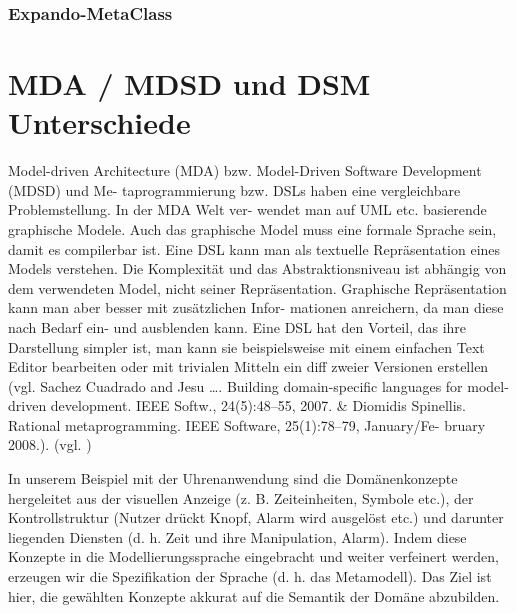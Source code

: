 \documentclass[11pt,english,ngerman, headsepline]{scrreprt}
\begin{document}
\subsection{Expando-MetaClass}


\chapter{MDA / MDSD und DSM Unterschiede} 
Model-driven Architecture (MDA) bzw. Model-Driven Software Development (MDSD)
und Me- taprogrammierung bzw. DSLs haben eine vergleichbare Problemstellung. In
der MDA Welt ver- wendet man auf UML etc. basierende graphische Modele. Auch das
graphische Model muss eine formale Sprache sein, damit es compilerbar ist. Eine
DSL kann man als textuelle Repräsentation eines Models verstehen.
Die Komplexität und das Abstraktionsniveau ist abhängig von dem verwendeten
Model, nicht seiner Repräsentation. Graphische Repräsentation kann man aber
besser mit zusätzlichen Infor- mationen anreichern, da man diese nach Bedarf
ein- und ausblenden kann.
Eine DSL hat den Vorteil, das ihre Darstellung simpler ist, man kann sie
beispielsweise mit einem einfachen Text Editor bearbeiten oder mit trivialen
Mitteln ein diff zweier Versionen erstellen (vgl. Sachez Cuadrado and
Jesu \ldots. Building domain-specific languages for model-driven
development. IEEE Softw., 24(5):48–55, 2007. \& Diomidis Spinellis. Rational
metaprogramming. IEEE Software, 25(1):78–79, January/Fe- bruary 2008.).
 (vgl. \cite{biekermetaprogrammierung})
 
 
 In unserem Beispiel mit der Uhrenanwendung sind die
Domänenkonzepte hergeleitet aus der visuellen Anzeige (z.
B. Zeiteinheiten, Symbole etc.), der Kontrollstruktur (Nutzer
drückt Knopf, Alarm wird ausgelöst etc.) und darunter liegenden
Diensten (d. h. Zeit und ihre Manipulation, Alarm). Indem
diese Konzepte in die Modellierungssprache eingebracht und
weiter verfeinert werden, erzeugen wir die Spezifikation der
Sprache (d. h. das Metamodell). Das Ziel ist hier, die gewählten
Konzepte akkurat auf die Semantik der Domäne abzubilden. \cite{dsmUhrenArtikel}
 
 
  
\end{document}

